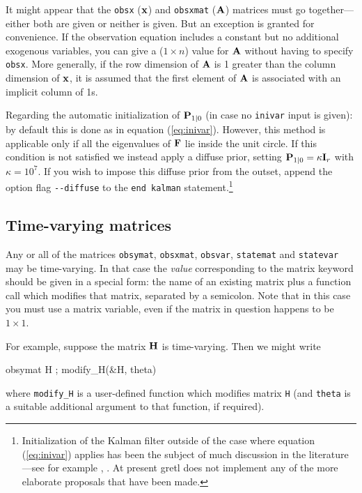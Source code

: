 It might appear that the \texttt{obsx} ($\mathbf{x}$) and \texttt{obsxmat}
($\mathbf{A}$) matrices must go together---either both are given or
neither is given.  But an exception is granted for convenience.  If
the observation equation includes a constant but no additional
exogenous variables, you can give a ($1 \times n$) value for
$\mathbf{A}$ without having to specify \texttt{obsx}.  More generally,
if the row dimension of $\mathbf{A}$ is 1 greater than the column
dimension of $\mathbf{x}$, it is assumed that the first element of
$\mathbf{A}$ is associated with an implicit column of 1s.

Regarding the automatic initialization of $\mathbf{P}_{1|0}$ (in case
no \texttt{inivar} input is given): by default this is done as in
equation (\ref{eq:inivar}).  However, this method is applicable only
if all the eigenvalues of $\mathbf{F}$ lie inside the unit circle.  If
this condition is not satisfied we instead apply a diffuse prior,
setting $\mathbf{P}_{1|0} = \kappa \mathbf{I}_r$ with $\kappa = 10^7$.
If you wish to impose this diffuse prior from the outset, append the
option flag \verb|--diffuse| to the \texttt{end kalman}
statement.\footnote{ Initialization of the Kalman filter outside of
  the case where equation (\ref{eq:inivar}) applies has been the
  subject of much discussion in the literature---see for example
  \cite{dejong91}, \cite{koopman97}.  At present gretl does not
  implement any of the more elaborate proposals that have been made.}

\subsection{Time-varying matrices}

Any or all of the matrices \texttt{obsymat}, \texttt{obsxmat},
\texttt{obsvar}, \texttt{statemat} and \texttt{statevar} may be
time-varying.  In that case the \textsl{value} corresponding to the
matrix keyword should be given in a special form: the name of an
existing matrix plus a function call which modifies that matrix,
separated by a semicolon.  Note that in this case you must use
a matrix variable, even if the matrix in question happens to be
$1 \times 1$. 

For example, suppose the matrix $\mathbf{H}$ is time-varying.  Then we
might write
%
\begin{code}
obsymat H ; modify_H(&H, theta)
\end{code}
%
where \texttt{modify\_H} is a user-defined function which modifies
matrix \texttt{H} (and \texttt{theta} is a suitable additional
argument to that function, if required).

